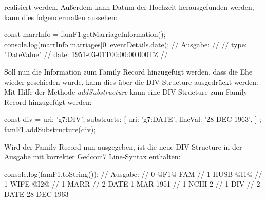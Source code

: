 realisiert werden. Außerdem kann Datum der Hochzeit herausgefunden werden, kann dies folgendermaßen aussehen:
\begin{center}
	const marrInfo = famF1.getMarriageInformation();
	console.log(marrInfo.marriages[0].eventDetails.date);
	// Ausgabe: 
	// {
	//    type: "DateValue"
	//    date: 1951-03-01T00:00:00.000TZ
	// }
\end{center}
Soll nun die Information zum Family Record hinzugefügt werden, dass die Ehe wieder geschieden wurde, kann dies über die DIV-Structure ausgedrückt werden. Mit Hilfe der Methode \textit{addSubstructure} kann eine DIV-Structure zum Family Record hinzugefügt werden:
\begin{center}
	const div = {
		uri: 'g7:DIV',
		substructs: [{
			uri: 'g7:DATE',
			lineVal: '28 DEC 1963',
		}]
	};
	famF1.addSubstructure(div);
\end{center}
Wird der Family Record nun ausgegeben, ist die neue DIV-Structure in der Ausgabe mit korrekter Gedcom7 Line-Syntax enthalten:
\begin{center}
	console.log(famF1.toString());
	// Ausgabe: 
	// 0 @F1@ FAM
	// 1 HUSB @I1@
	// 1 WIFE @I2@
	// 1 MARR
	// 2 DATE 1 MAR 1951
	// 1 NCHI 2
	// 1 DIV
	// 2 DATE 28 DEC 1963
\end{center}
